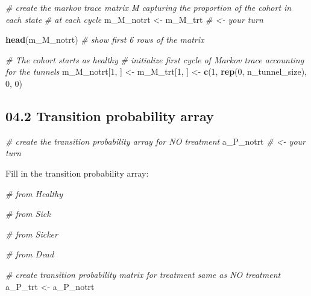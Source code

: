 \documentclass[
]{article}
\newenvironment{Shaded}{\begin{snugshade}}{\end{snugshade}}
\newcommand{\CommentTok}[1]{\textcolor[rgb]{0.56,0.35,0.01}{\textit{#1}}}
\newcommand{\DecValTok}[1]{\textcolor[rgb]{0.00,0.00,0.81}{#1}}
\newcommand{\KeywordTok}[1]{\textcolor[rgb]{0.13,0.29,0.53}{\textbf{#1}}}
\newcommand{\NormalTok}[1]{#1}
\newcommand{\StringTok}[1]{\textcolor[rgb]{0.31,0.60,0.02}{#1}}
\begin{document}
\begin{Shaded}
\begin{Highlighting}[]
\CommentTok{# create the markov trace matrix M capturing the proportion of the cohort in each state }
\CommentTok{# at each cycle}
\NormalTok{m_M_notrt <-}\StringTok{ }\NormalTok{m_M_trt  }\CommentTok{# <-  your turn}





\KeywordTok{head}\NormalTok{(m_M_notrt) }\CommentTok{# show first 6 rows of the matrix }

\CommentTok{# The cohort starts as healthy}
\CommentTok{# initialize first cycle of Markov trace accounting for the tunnels}
\NormalTok{m_M_notrt[}\DecValTok{1}\NormalTok{, ] <-}\StringTok{ }\NormalTok{m_M_trt[}\DecValTok{1}\NormalTok{, ] <-}\StringTok{ }\KeywordTok{c}\NormalTok{(}\DecValTok{1}\NormalTok{, }\KeywordTok{rep}\NormalTok{(}\DecValTok{0}\NormalTok{, n_tunnel_size), }\DecValTok{0}\NormalTok{, }\DecValTok{0}\NormalTok{) }
\end{Highlighting}
\end{Shaded}

\hypertarget{transition-probability-array}{%
\subsection{04.2 Transition probability
array}\label{transition-probability-array}}

\begin{Shaded}
\begin{Highlighting}[]
\CommentTok{# create the transition probability array for NO treatment}
\NormalTok{a_P_notrt }\CommentTok{# <- your turn}
\end{Highlighting}
\end{Shaded}

Fill in the transition probability array:

\begin{Shaded}
\begin{Highlighting}[]
\CommentTok{# from Healthy}

\CommentTok{# from Sick}

\CommentTok{# from Sicker}

\CommentTok{# from Dead}

\CommentTok{# create transition probability matrix for treatment same as NO treatment}
\NormalTok{a_P_trt <-}\StringTok{ }\NormalTok{a_P_notrt}
\end{Highlighting}
\end{Shaded}
\end{document}
